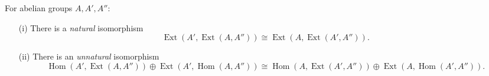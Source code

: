 For abelian groups $A, A', A''$:
\begin{enumerate}
    \item[(i)] There is a \emph{natural} isomorphism
    $$\operatorname{Ext}(A', \operatorname{Ext}(A, A'')) \cong \operatorname{Ext}(A, \operatorname{Ext}(A', A'')).$$
    \item[(ii)] There is an \emph{unnatural} isomorphism
    $$\operatorname{Hom}(A', \operatorname{Ext}(A, A'')) \oplus \operatorname{Ext}(A', \operatorname{Hom}(A, A'')) \cong \operatorname{Hom}(A, \operatorname{Ext}(A', A'')) \oplus \operatorname{Ext}(A, \operatorname{Hom}(A', A'')).$$
\end{enumerate}
